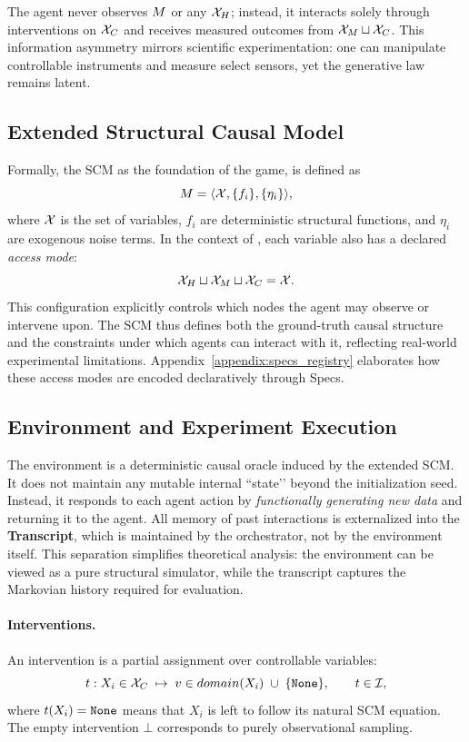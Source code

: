 The agent never observes $M$ or any $\mathcal{X}_H$; instead, it interacts solely through interventions on $\mathcal{X}_C$ and receives measured outcomes from $\mathcal{X}_M \sqcup \mathcal{X}_C$. 
This information asymmetry mirrors scientific experimentation: one can manipulate controllable instruments and measure select sensors, yet the generative law remains latent.

\subsection{Extended Structural Causal Model}
Formally, the SCM as the foundation of the game, is defined as
\[
    M = \langle \mathcal{X}, \{f_i\}, \{\eta_i\} \rangle,
\]
where $\mathcal{X}$ is the set of variables, $f_i$ are deterministic structural functions, and $\eta_i$ are exogenous noise terms.
In the context of \game, each variable also has a declared \emph{access mode}:
\[
    \mathcal{X}_H \sqcup \mathcal{X}_M \sqcup \mathcal{X}_C = \mathcal{X}.
\]
This configuration explicitly controls which nodes the agent may observe or intervene upon.  
The SCM thus defines both the ground-truth causal structure and the constraints under which agents can interact with it, reflecting real-world experimental limitations.
Appendix~\ref{appendix:specs_registry} elaborates how these access modes are encoded declaratively through Specs.

\subsection{Environment and Experiment Execution}
The environment is a deterministic causal oracle induced by the extended SCM. It does not maintain any mutable internal ``state’’ beyond the initialization seed. Instead, it responds to each agent action by \emph{functionally generating new data} and returning it to the agent. All memory of past interactions is externalized into the \textbf{Transcript}, which is maintained by the \game orchestrator, not by the environment itself. This separation simplifies theoretical analysis: the environment can be viewed as a pure structural simulator, while the transcript captures the Markovian history required for evaluation.

\paragraph{Interventions.}
An intervention is a partial assignment over controllable variables:
\[
    \intervention : X_i \in \controllablex \;\mapsto\; v \in domain(X_i) \;\cup\; \{\none\},
\qquad
\intervention \in \interventions,
\]
where $\intervention(X_i) = \none$ means that $X_i$ is left to follow its natural SCM equation. The empty intervention $\bot$ corresponds to purely observational sampling.


